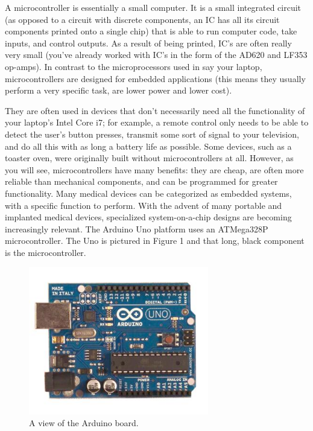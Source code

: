 \documentclass[10pt]{report}
\begin{document}
A microcontroller is essentially a small computer. It is a small integrated circuit (as opposed to a circuit with discrete components, an IC has all its circuit components printed onto a single chip) that is able to run computer code, take inputs, and control outputs. As a result of being printed, IC’s are often really very small (you’ve already worked with IC’s in the form of the AD620 and LF353 op-amps). In contrast to the microprocessors used in say your laptop, microcontrollers are designed for embedded applications (this means they usually perform a very specific task, are lower power and lower cost). 
\par
They are often used in devices that don’t necessarily need all the functionality of your laptop’s Intel Core i7; for example, a remote control only needs to be able to detect the user’s button presses, transmit some sort of signal to your television, and do all this with as long a battery life as possible. Some devices, such as a toaster oven, were originally built without microcontrollers at all. However, as you will see, microcontrollers have many benefits: they are cheap, are often more reliable than mechanical components, and can be programmed for greater functionality. Many medical devices can be categorized as embedded systems, with a specific function to perform. With the advent of many portable and implanted medical devices, specialized system-on-a-chip designs are becoming increasingly relevant. The Arduino Uno platform uses an ATMega328P microcontroller. The Uno is pictured in Figure 1 and that long, black component is the microcontroller.

\begin{figure}[H]
\centering
   \includegraphics[width=0.7\textwidth]{arduino.jpg}
    \caption{A view of the Arduino board.}
\end{figure}
\end{document}
